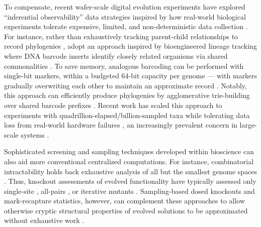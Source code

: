 To compensate, recent wafer-scale digital evolution experiments have explored ``inferential observability'' data strategies inspired by how real-world biological experiments tolerate expensive, limited, and non-deterministic data collection \citep{moreno2024trackable,moreno2025mutator,moreno2027trust}.
For instance, rather than exhaustively tracking parent-child relationships to record phylogenies \citep{dolson2024phylotrackpy}, \citet{moreno2022hereditary} adopt an approach inspired by bioengineered lineage tracking where DNA barcode inserts identify closely related organisms via shared commonalities \citep{masuyama2019dna,wagner2020lineage,mckenna2016wholeorganism,kebschull2018cellular,askary2024lives,sashittal2023startle,kong2020celltagging,chow2021imaging,chen2022connecting,choi2022timeresolved,kalhor2016rapidly}.
To save memory, analogous barcoding can be performed with single-bit markers, within a budgeted 64-bit capacity per genome \citep{moreno2025testing} --- with markers gradually overwriting each other to maintain an approximate record \citep{moreno2024algorithms}.
Notably, this approach can efficiently produce phylogenies by agglomerative trie-building over shared barcode prefixes \citep{moreno2023toward}.
Recent work has scaled this approach to experiments with quadrillion-elapsed/billion-sampled taxa \citep{singhvi2025scalable} while tolerating data loss from real-world hardware failures \citep{moreno2027trust}, an increasingly prevalent concern in large-scale systems \citep{snir2014addressing,kokolis2025revisiting}.

Sophisticated screening and sampling techniques developed within bioscience \citep{amstrup2005handbook,mackenzie2017occupancy,amsterdam2004identification,glanville2009precise} can also aid more conventional centralized computations.
For instance, combinatorial intractability holds back exhaustive analysis of all but the smallest genome spaces \citep{nitash2021information}.
Thus, knockout assessments of evolved functionality have typically assessed only single-site \citep{adami2006digital}, all-pairs \citep{kumawat2024evolution}, or iterative mutants \citep{langdon2014improving,moreno2021case}.
Sampling-based dosed knockouts and mark-recapture statistics, however, can complement these approaches to allow otherwise cryptic structural properties of evolved solutions to be approximated without exhaustive work \citep{moreno2024cryptic}.
